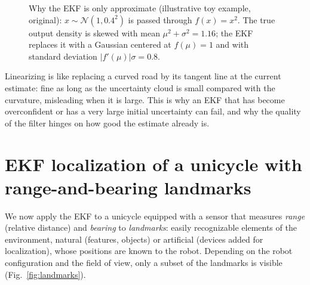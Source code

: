 \documentclass[11pt,a4paper]{article}
\newcommand{\slides}[1]{\texorpdfstring{\hspace{0.5em}{\normalfont\small\emph{(#1)}}}{}}
\theoremstyle{definition}
\theoremstyle{plain}
\theoremstyle{remark}
\begin{document}
\begin{figure}[H]
\centering
{}
\caption{Why the EKF is only approximate (illustrative toy example, original): $x\sim\mathcal N(1,0.4^2)$ is passed through $f(x)=x^2$.
The true output density is skewed with mean $\mu^2+\sigma^2=1.16$; the EKF replaces it with a Gaussian centered at $f(\mu)=1$ and with
standard deviation $|f'(\mu)|\sigma=0.8$.}\label{fig:ekfapprox}
\end{figure}

\begin{intuition}
Linearizing is like replacing a curved road by its tangent line at the current estimate: fine as long as the uncertainty
cloud is small compared with the curvature, misleading when it is large. This is why an EKF that has become overconfident or has a very
large initial uncertainty can fail, and why the quality of the filter hinges on how good the estimate already is.
\end{intuition}

\section{EKF localization of a unicycle with range-and-bearing landmarks \slides{book, Sect.\ 7.7.2}}

We now apply the EKF to a unicycle equipped with a sensor that measures \emph{range} (relative distance) and \emph{bearing} to
\emph{landmarks}: easily recognizable elements of the environment, natural (features, objects) or artificial (devices added for
localization), whose positions are known to the robot. Depending on the robot configuration and the field of view, only a subset of the
landmarks is visible (Fig.~\ref{fig:landmarks}).
\end{document}
